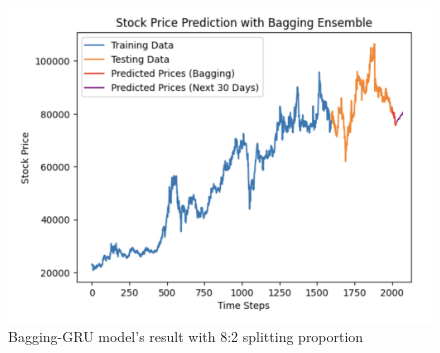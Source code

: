 \documentclass{ieeeojies}
\begin{document}
\begin{figure}[H]
  \centering
  \begin{minipage}{0.8\linewidth}
    \centering
    \includegraphics[width=\linewidth]{bibliography/baggingGRU_vcb.png}
    \caption{Bagging-GRU model's result with 8:2 splitting proportion}
    \label{bagginggru}
  \end{minipage}
\end{figure}
\end{document}
